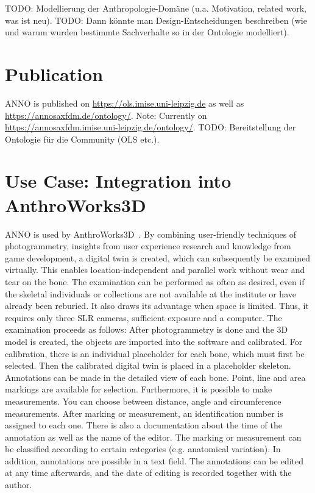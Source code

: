 \documentclass[sw]{iosart2x}
\newcommand{\aw}{AnthroWorks3D}
\begin{document}
TODO: Modellierung der Anthropologie-Domäne (u.a. Motivation, related work, was ist neu).
TODO: Dann könnte man Design-Entscheidungen beschreiben (wie und warum wurden bestimmte Sachverhalte so in der Ontologie modelliert).
\section{Publication}
ANNO is published on \url{https://ols.imise.uni-leipzig.de} as well as \url{https://annosaxfdm.de/ontology/}.
Note: Currently on \url{https://annosaxfdm.imise.uni-leipzig.de/ontology/}.
TODO: Bereitstellung der Ontologie für die Community (OLS etc.).

\section{Use Case: Integration into \aw{}}
ANNO is used by \aw{}~\citep{aw3d}.
By combining user-friendly techniques of photogrammetry, insights from user experience research and knowledge from game development, a digital twin is created, which can subsequently be examined virtually.
This enables location-independent and parallel work without wear and tear on the bone.
The examination can be performed as often as desired, even if the skeletal individuals or collections are not available at the institute or have already been reburied.
It also draws its advantage when space is limited.
Thus, it requires only three SLR cameras, sufficient exposure and a computer.
The examination proceeds as follows: After photogrammetry is done and the 3D model is created, the objects are imported into the software and calibrated.
For calibration, there is an individual placeholder for each bone, which must first be selected.
Then the calibrated digital twin is placed in a placeholder skeleton.
Annotations can be made in the detailed view of each bone.
Point, line and area markings are available for selection.
Furthermore, it is possible to make measurements.
You can choose between distance, angle and circumference measurements.
After marking or measurement, an identification number is assigned to each one.
There is also a documentation about the time of the annotation as well as the name of the editor.
The marking or measurement can be classified according to certain categories (e.g. anatomical variation).
In addition, annotations are possible in a text field.
The annotations can be edited at any time afterwards, and the date of editing is recorded together with the author.
\end{document}

